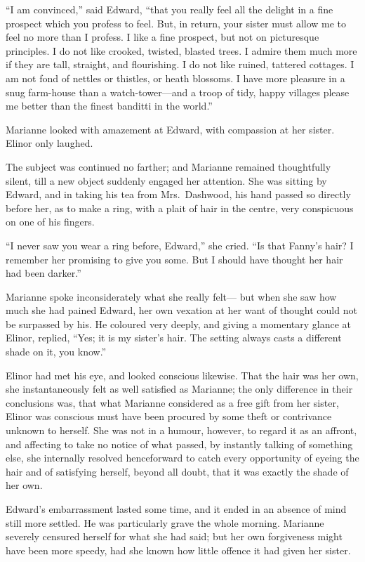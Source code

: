 \documentclass{article}
\begin{document}
``I am convinced,'' said Edward, ``that you really feel
all the delight in a fine prospect which you profess
to feel.  But, in return, your sister must allow me
to feel no more than I profess.  I like a fine prospect,
but not on picturesque principles.  I do not like crooked,
twisted, blasted trees.  I admire them much more if they
are tall, straight, and flourishing.  I do not like ruined,
tattered cottages.  I am not fond of nettles or thistles,
or heath blossoms.  I have more pleasure in a snug
farm-house than a watch-tower---and a troop of tidy,
happy villages please me better than the finest banditti
in the world.''

Marianne looked with amazement at Edward,
with compassion at her sister.  Elinor only laughed.

The subject was continued no farther; and Marianne
remained thoughtfully silent, till a new object suddenly
engaged her attention.  She was sitting by Edward, and
in taking his tea from Mrs.\ Dashwood, his hand passed
so directly before her, as to make a ring, with a plait
of hair in the centre, very conspicuous on one of his fingers.

``I never saw you wear a ring before, Edward,'' she cried.
``Is that Fanny's hair? I remember her promising to give
you some.  But I should have thought her hair had been darker.''

Marianne spoke inconsiderately what she really felt---%
but when she saw how much she had pained Edward, her own
vexation at her want of thought could not be surpassed
by his.  He coloured very deeply, and giving a momentary
glance at Elinor, replied, ``Yes; it is my sister's hair.
The setting always casts a different shade on it,
you know.''

Elinor had met his eye, and looked conscious likewise.
That the hair was her own, she instantaneously felt as
well satisfied as Marianne; the only difference in their
conclusions was, that what Marianne considered as a free
gift from her sister, Elinor was conscious must have been
procured by some theft or contrivance unknown to herself.
She was not in a humour, however, to regard it as an affront,
and affecting to take no notice of what passed,
by instantly talking of something else, she internally
resolved henceforward to catch every opportunity of eyeing
the hair and of satisfying herself, beyond all doubt,
that it was exactly the shade of her own.

Edward's embarrassment lasted some time, and it
ended in an absence of mind still more settled.
He was particularly grave the whole morning.
Marianne severely censured herself for what she had said;
but her own forgiveness might have been more speedy,
had she known how little offence it had given her sister.
\end{document}
